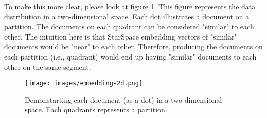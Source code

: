 To make this more clear, please look at figure \ref{fig:embedding-space}. This figure represents the data distribution in a two-dimensional space. Each dot illustrates a document on a partition. The documents on each quadrant can be considered "similar" to each other. The intuition here is that StarSpace embedding vectors of "similar" documents would be "near" to each other. Therefore, producing the documents on each partition (i.e., quadrant) would end up having "similar" documents to each other on the same segment.


\begin{figure}[!ht]
    \centering
    \texttt{[image: images/embedding-2d.png]}
    \caption{Demonstarting each document (as a dot) in a two dimensional space. Each quadrants represents a partition.}
    \label{fig:embedding-space}
\end{figure}

